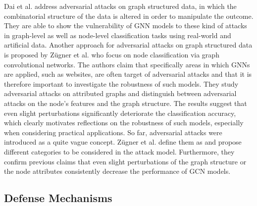 \documentclass[a4paper,preprint]{sig-alternate}
\begin{document}
Dai et al. \cite{Dai_2018} address adversarial attacks on graph structured data, in which the combinatorial structure of 
the data is altered in order to manipulate the outcome. They are able to show the vulnerability of GNN models to these kind of attacks
in graph-level as well as node-level classification tasks using real-world and artificial data.\newline
Another approach for adversarial attacks on graph structured data is proposed by Zügner et al. \cite{Zuegner_2018} who focus on node classification
via graph convolutional networks. The authors claim that specifically areas in which GNNs are applied, such as websites, are often target of
adversarial attacks and that it is therefore important to investigate the robustness of such models. They study adversarial attacks on attributed graphs 
and distinguish between adversarial attacks on the node's features and the graph structure.
The results suggest that even slight perturbations significantly deteriorate the classification accuracy, which clearly motivates reflections
on the robustness of such models, especially when considering practical applications.\newline
So far, adversarial attacks were introduced as a quite vague concept. Zügner et al. \cite{zuegner2019adversarial}
define them as 
and propose different categories to be considered in the attack model. Furthermore, they confirm previous claims that 
even slight perturbations of the graph structure or the node attributes consistently decrease the performance of GCN models.

\subsection{Defense Mechanisms}
\label{sec:rev2}
\end{document}

